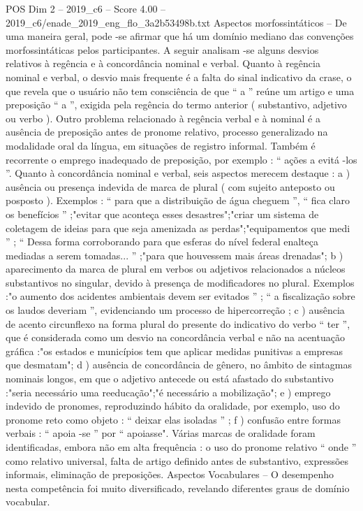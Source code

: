 \begin{textsample}{POS Dim 2 – 2019\_c6 – Score 4.00 – 2019\_c6/enade\_2019\_eng\_flo\_3a2b53498b.txt}
Aspectos morfossintáticos – De uma maneira geral, pode -se afirmar que há um domínio mediano das convenções morfossintáticas pelos participantes.
A seguir analisam -se alguns desvios relativos à regência e à concordância nominal e verbal.
Quanto à regência nominal e verbal, o desvio mais frequente é a falta do sinal indicativo da crase, o que revela que o usuário não tem consciência de que “ a ” reúne um artigo e uma preposição “ a ”, exigida pela regência do termo anterior ( substantivo, adjetivo ou verbo ).
Outro problema relacionado à regência verbal e à nominal é a ausência de preposição antes de pronome relativo, processo generalizado na modalidade oral da língua, em situações de registro informal.
Também é recorrente o emprego inadequado de preposição, por exemplo : “ ações a evitá -los ”.
Quanto à concordância nominal e verbal, seis aspectos merecem destaque : a ) ausência ou presença indevida de marca de plural ( com sujeito anteposto ou posposto ).
Exemplos : “ para que a distribuição de água cheguem ”, “ fica claro os benefícios ” ;"evitar que aconteça esses desastres";"criar um sistema de coletagem de ideias para que seja amenizada as perdas";"equipamentos que medi ” ; “ Dessa forma corroborando para que esferas do nível federal enalteça mediadas a serem tomadas... ” ;"para que houvessem mais áreas drenadas"; b ) aparecimento da marca de plural em verbos ou adjetivos relacionados a núcleos substantivos no singular, devido à presença de modificadores no plural.
Exemplos :"o aumento dos acidentes ambientais devem ser evitados ” ; “ a fiscalização sobre os laudos deveriam ”, evidenciando um processo de hipercorreção ; c ) ausência de acento circunflexo na forma plural do presente do indicativo do verbo “ ter ”, que é considerada como um desvio na concordância verbal e não na acentuação gráfica :"os estados e municípios tem que aplicar medidas punitivas a empresas que desmatam"; d ) ausência de concordância de gênero, no âmbito de sintagmas nominais longos, em que o adjetivo antecede ou está afastado do substantivo :"seria necessário uma reeducação";"é necessário a mobilização"; e ) emprego indevido de pronomes, reproduzindo hábito da oralidade, por exemplo, uso do pronome reto como objeto : “ deixar elas isoladas ” ; f ) confusão entre formas verbais : “ apoia -se ” por “ apoiasse".
Várias marcas de oralidade foram identificadas, embora não em alta frequência : o uso do pronome relativo “ onde ” como relativo universal, falta de artigo definido antes de substantivo, expressões informais, eliminação de preposições.
Aspectos Vocabulares – O desempenho nesta competência foi muito diversificado, revelando diferentes graus de domínio vocabular.

\end{textsample}
